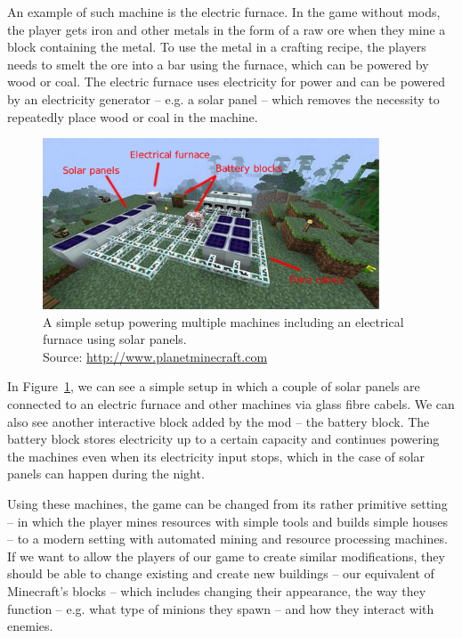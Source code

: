 An example of such machine is the electric furnace. In the game without mods, the player gets iron and other metals in the form
of a raw ore when they mine a block containing the metal. To use the metal in a crafting recipe, the players needs to smelt the ore
into a bar using the furnace, which can be powered by wood or coal. The electric furnace uses electricity for power and can be
powered by an electricity generator -- e.g. a solar panel -- which removes the necessity to repeatedly place wood or coal in
the machine.

\begin{figure}[H]
    \centering
    \includegraphics[width=10cm]{../img/ic-solar.pdf}
    \caption{A simple setup powering multiple machines including an electrical furnace using solar panels.
             \\Source: \href{http://static.planetminecraft.com/files/resource\_media/screenshot/1246/javaw-2012-11-12-20-51-09-46\_4122139.jpg}{http://www.planetminecraft.com}}
    \label{ic-solar}
\end{figure}

In Figure~\ref{ic-solar}, we can see a simple setup in which a couple of solar panels are connected to an electric furnace and other
machines via glass fibre cabels. We can also see another interactive block added by the mod -- the battery block. The battery block
stores electricity up to a certain capacity and continues powering the machines even when its electricity input stops, which in the
case of solar panels can happen during the night.

Using these machines, the game can be changed from its rather primitive setting -- in which the player mines resources with simple
tools and builds simple houses -- to a modern setting with automated mining and resource processing machines. If we want to allow
the players of our game to create similar modifications, they should be able to change existing and create new buildings -- our equivalent of 
Minecraft's blocks -- which includes changing their appearance, the way they function -- e.g. what type of minions they spawn -- and
how they interact with enemies.

